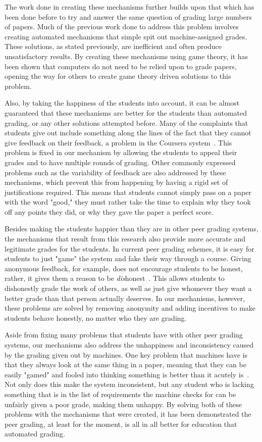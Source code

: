 \documentclass[12pt, Arial]{article}
\begin{document}
The work done in creating these mechanisms further builds upon that which has been done before to try and answer the same question of grading large numbers of papers. Much of the previous work done to address this problem involves creating automated mechanisms that simple spit out machine-assigned grades. These solutions, as stated previously, are inefficient and often produce unsatisfactory results. By creating these mechanisms using game theory, it has been shown that computers do not need to be relied upon to grade papers, opening the way for others to create game theory driven solutions to this problem.

Also, by taking the happiness of the students into account, it can be almost guaranteed that these mechanisms are better for the students than automated grading, or any other solutions attempted before. Many of the complaints that students give out include something along the lines of the fact that they cannot give feedback on their feedback, a problem in the Coursera system~\cite{theproblemswithpeergradingincoursera}. This problem is fixed in our mechanism by allowing the students to appeal their grades and to have multiple rounds of grading. Other commonly expressed problems such as the variability of feedback are also addressed by these mechanisms, which prevent this from happening by having a rigid set of justifications required. This means that students cannot simply pass on a paper with the word "good," they must rather take the time to explain why they took off any points they did, or why they gave the paper a perfect score.

Besides making the students happier than they are in other peer grading systems, the mechanisms that result from this research also provide more accurate and legitimate grades for the students. In current peer grading schemes, it is easy for students to just "game" the system and fake their way through a course. Giving anonymous feedback, for example, does not encourage students to be honest, rather, it gives them a reason to be \emph{dis}honest~\cite{theproblemswithpeergradingincoursera}. This allows students to dishonestly grade the work of others, as well as just give whomever they want a better grade than that person actually deserves. In our mechanisms, however, these problems are solved by removing anonymity and adding incentives to make students behave honestly, no matter who they are grading.

Aside from fixing many problems that students have with other peer grading systems, our mechanisms also address the unhappiness and inconsistency caused by the grading given out by machines. One key problem that machines have is that they always look at the same thing in a paper, meaning that they can be easily "gamed" and fooled into thinking something is better than it acutely is~\cite{robogradingproblems}. Not only does this make the system inconsistent, but any student who is lacking something that is in the list of requirements the machine checks for can be unfairly given a poor grade, making them unhappy. By solving both of these problems with the mechanisms that were created, it has been demonstrated the peer grading, at least for the moment, is all in all better for education that automated grading.
\end{document}
